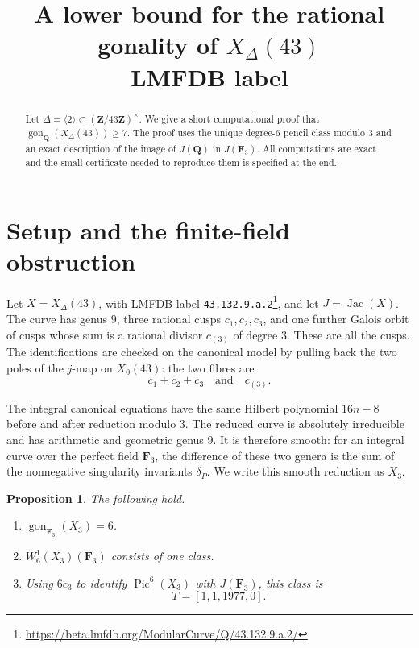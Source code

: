 \documentclass[11pt]{article}
\title{\vspace{-2em}\textbf{A lower bound for the rational gonality of
\(X_\Delta(43)\)}\\[3pt]
\large LMFDB label \code{43.132.9.a.2}}
\author{}
\date{}
\newcommand{\Q}{\mathbf Q}
\newcommand{\F}{\mathbf F}
\newcommand{\Pic}{\operatorname{Pic}}
\newcommand{\Jac}{\operatorname{Jac}}
\newcommand{\gon}{\operatorname{gon}}
\newcommand{\code}[1]{\texttt{#1}}
\newtheorem{proposition}[theorem]{Proposition}
\begin{document}
\maketitle
\vspace{-3em}

\begin{abstract}
Let \(\Delta=\langle2\rangle\subset(\mathbf Z/43\mathbf Z)^\times\).
We give a short computational proof that
\(\gon_{\Q}(X_\Delta(43))\geq7\).  The proof uses the unique
degree-\(6\) pencil class modulo \(3\) and an exact description of the
image of \(J(\Q)\) in \(J(\F_3)\).  All computations are exact and the
small certificate needed to reproduce them is specified at the end.
\end{abstract}

\section{Setup and the finite-field obstruction}

Let \(X=X_\Delta(43)\), with LMFDB label
\code{43.132.9.a.2}\footnote{\url{https://beta.lmfdb.org/ModularCurve/Q/43.132.9.a.2/}},
and let \(J=\Jac(X)\).  The curve has genus \(9\), three rational cusps
\(c_1,c_2,c_3\), and one further Galois orbit of cusps whose sum is a
rational divisor \(c_{(3)}\) of degree \(3\).  These are all the cusps.
The identifications are checked on the canonical model by pulling back
the two poles of the \(j\)-map on \(X_0(43)\): the two fibres are
\[
                     c_1+c_2+c_3
             \quad\text{and}\quad c_{(3)}.
\tag{1.1}\label{eq:cusp-fibres}
\]

The integral canonical equations have the same Hilbert polynomial
\(16n-8\) before and after reduction modulo \(3\).  The reduced curve is
absolutely irreducible and has arithmetic and geometric genus \(9\).
It is therefore smooth: for an integral curve over the perfect field
\(\F_3\), the difference of these two genera is the sum of the
nonnegative singularity invariants \(\delta_P\).  We write this smooth
reduction as \(X_3\).

\begin{proposition}\label{prop:f3}
The following hold.
\begin{enumerate}
\item \(\gon_{\F_3}(X_3)=6\).
\item \(W^1_6(X_3)(\F_3)\) consists of one class.
\item Using \(6c_3\) to identify \(\Pic^6(X_3)\) with \(J(\F_3)\), this
      class is
      \[
                         T=[1,1,1977,0].
      \tag{1.2}\label{eq:T}
      \]
\end{enumerate}
\end{proposition}
\end{document}
